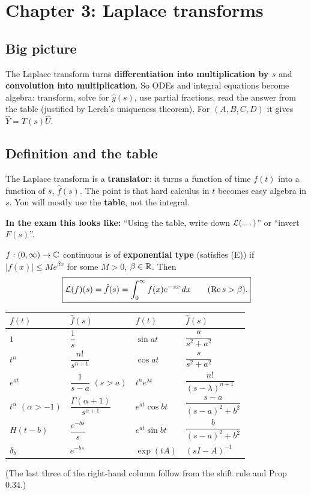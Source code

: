 \section{Chapter 3: Laplace transforms \texorpdfstring{}{}}
\label{ch3}

\subsection*{Big picture}
The Laplace transform turns \textbf{differentiation into multiplication by $s$} and \textbf{convolution into multiplication}.
So ODEs and integral equations become algebra: transform, solve for $\hat y(s)$, use partial fractions, read the answer from the table
(justified by Lerch's uniqueness theorem). For $(A,B,C,D)$ it gives $\hat Y=T(s)\hat U$.

\subsection{Definition and the table \texorpdfstring{}{}}\label{ss:3-1}
\begin{plainbox}
The Laplace transform is a \textbf{translator}: it turns a function of time $f(t)$ into a function of $s$, $\hat f(s)$.
The point is that hard calculus in $t$ becomes easy algebra in $s$. You will mostly use the \textbf{table}, not the integral.
\par\smallskip\textbf{In the exam this looks like:} ``Using the table, write down $\mathcal{L}(\dots)$'' or ``invert $F(s)$''.
\end{plainbox}
\begin{defbox}
$f:(0,\infty)\to\mathbb{C}$ continuous is of \textbf{exponential type} (satisfies (E)) if $|f(x)|\le Me^{\beta x}$ for some $M>0$, $\beta\in\mathbb{R}$.
Then
\[\boxed{\mathcal{L}(f)(s)=\hat f(s)=\int_0^\infty f(x)e^{-sx}\,dx\qquad(\operatorname{Re} s>\beta).}\]
\end{defbox}
\begin{center}
\renewcommand{\arraystretch}{1.55}
\begin{tabular}{@{}ll|ll@{}}
\toprule
$f(t)$ & $\hat f(s)$ & $f(t)$ & $\hat f(s)$\\\midrule
$1$ & $\dfrac1s$ & $\sin at$ & $\dfrac{a}{s^2+a^2}$\\
$t^n$ & $\dfrac{n!}{s^{n+1}}$ & $\cos at$ & $\dfrac{s}{s^2+a^2}$\\
$e^{at}$ & $\dfrac1{s-a}$ $(s>a)$ & $t^ne^{\lambda t}$ & $\dfrac{n!}{(s-\lambda)^{n+1}}$\\
$t^\alpha$ $(\alpha>-1)$ & $\dfrac{\Gamma(\alpha+1)}{s^{\alpha+1}}$ & $e^{at}\cos bt$ & $\dfrac{s-a}{(s-a)^2+b^2}$\\
$H(t-b)$ & $\dfrac{e^{-bs}}s$ & $e^{at}\sin bt$ & $\dfrac{b}{(s-a)^2+b^2}$\\
$\delta_b$ & $e^{-bs}$ & $\exp(tA)$ & $(sI-A)^{-1}$\\
\bottomrule
\end{tabular}
\end{center}
(The last three of the right-hand column follow from the shift rule and Prop 0.34.)

